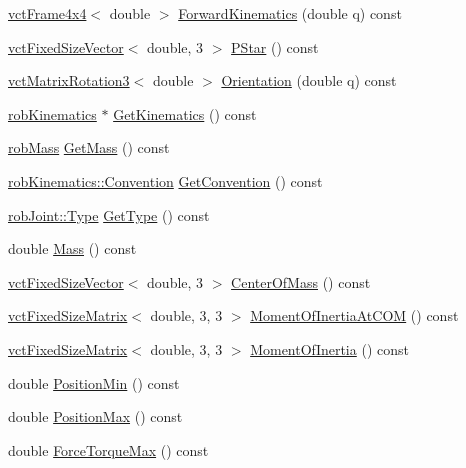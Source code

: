 \begin{DoxyCompactItemize}
\hyperlink{classvct_frame4x4}{vct\-Frame4x4}$<$ double $>$ \hyperlink{classrob_link_a1dc4dfce2a402d934f9c7e355c94e458}{Forward\-Kinematics} (double q) const 
\item 
\hyperlink{classvct_fixed_size_vector}{vct\-Fixed\-Size\-Vector}$<$ double, 3 $>$ \hyperlink{classrob_link_acd240f7a9609e54400811940131814da}{P\-Star} () const 
\item 
\hyperlink{classvct_matrix_rotation3}{vct\-Matrix\-Rotation3}$<$ double $>$ \hyperlink{classrob_link_a94ed71cb4c204e3fa29cd868891e626d}{Orientation} (double q) const 
\item 
\hyperlink{classrob_kinematics}{rob\-Kinematics} $\ast$ \hyperlink{classrob_link_aad5e8b2c6ecbc2203c77774517ec5afe}{Get\-Kinematics} () const 
\item 
\hyperlink{classrob_mass}{rob\-Mass} \hyperlink{classrob_link_a43269c243616e27131e91adc0a0251f2}{Get\-Mass} () const 
\item 
\hyperlink{classrob_kinematics_a298703e920da583d1f6aa60c8f65ca78}{rob\-Kinematics\-::\-Convention} \hyperlink{classrob_link_aa382b84e5e3fa242ffb67860002096bd}{Get\-Convention} () const 
\item 
\hyperlink{classrob_joint_a558d78a642cf2101aceddce0d82379b6}{rob\-Joint\-::\-Type} \hyperlink{classrob_link_a0053248e96d0b42e170bbee51e9e0606}{Get\-Type} () const 
\item 
double \hyperlink{classrob_link_a9c19539fa0f402dc8c496faf2632713a}{Mass} () const 
\item 
\hyperlink{classvct_fixed_size_vector}{vct\-Fixed\-Size\-Vector}$<$ double, 3 $>$ \hyperlink{classrob_link_aef245c56c6275da91a17ec04844c4f7c}{Center\-Of\-Mass} () const 
\item 
\hyperlink{classvct_fixed_size_matrix}{vct\-Fixed\-Size\-Matrix}$<$ double, 3, 3 $>$ \hyperlink{classrob_link_a7a2448af5a1fce4293c9b6ad801ea461}{Moment\-Of\-Inertia\-At\-C\-O\-M} () const 
\item 
\hyperlink{classvct_fixed_size_matrix}{vct\-Fixed\-Size\-Matrix}$<$ double, 3, 3 $>$ \hyperlink{classrob_link_a7a490ea913361ad155fa698080f1501f}{Moment\-Of\-Inertia} () const 
\item 
double \hyperlink{classrob_link_a95eb30b91371aab58976d2af316385d5}{Position\-Min} () const 
\item 
double \hyperlink{classrob_link_a0ac05c903c18d1e8db3ccbdec9312349}{Position\-Max} () const 
\item 
double \hyperlink{classrob_link_a09d91b44253f90a14442cc0ade0cb687}{Force\-Torque\-Max} () const 
\end{DoxyCompactItemize}
